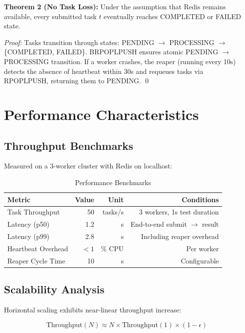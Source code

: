 \documentclass[11pt,a4paper]{article}
\begin{document}
\textbf{Theorem 2 (No Task Loss):} Under the assumption that Redis remains available, every submitted task $t$ eventually reaches COMPLETED or FAILED state.

\textit{Proof:} Tasks transition through states: PENDING $\to$ PROCESSING $\to$ \{COMPLETED, FAILED\}. BRPOPLPUSH ensures atomic PENDING $\to$ PROCESSING transition. If a worker crashes, the reaper (running every 10s) detects the absence of heartbeat within 30s and requeues tasks via RPOPLPUSH, returning them to PENDING. \qed

\section{Performance Characteristics}

\subsection{Throughput Benchmarks}

Measured on a 3-worker cluster with Redis on localhost:

\begin{table}[h]
\centering
\begin{tabular}{@{}lrrr@{}}
\toprule
\textbf{Metric} & \textbf{Value} & \textbf{Unit} & \textbf{Conditions} \\ \midrule
Task Throughput & 50 & tasks/s & 3 workers, 1s test duration \\
Latency (p50) & 1.2 & s & End-to-end submit $\to$ result \\
Latency (p99) & 2.8 & s & Including reaper overhead \\
Heartbeat Overhead & $< 1$ & \% CPU & Per worker \\
Reaper Cycle Time & 10 & s & Configurable \\ \bottomrule
\end{tabular}
\caption{Performance Benchmarks}
\label{tab:performance}
\end{table}

\subsection{Scalability Analysis}

Horizontal scaling exhibits near-linear throughput increase:

\begin{equation}
\text{Throughput}(N) \approx N \times \text{Throughput}(1) \times (1 - \epsilon)
\end{equation}
\end{document}
